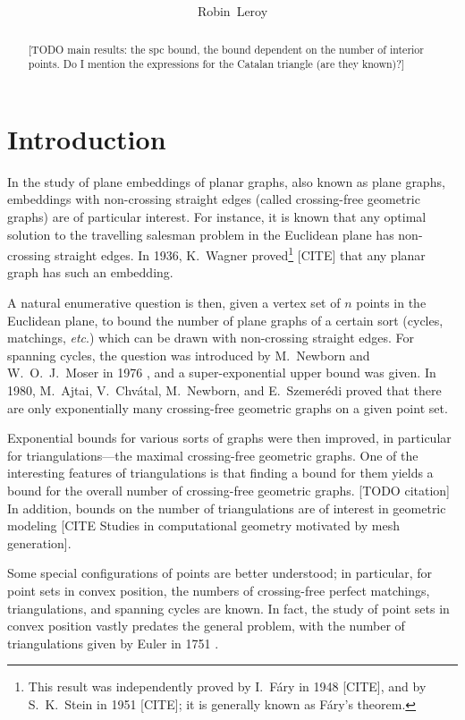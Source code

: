 \documentclass[10pt, a4paper, twoside]{basestyle}
\title{%
\textdisplay{%
On the number of crossing-free perfect matchings with designated left and right endpoints%
}%
}
\author{Robin~Leroy}
\newcommand{\etc}{\emph{etc}}
\begin{document}
\maketitle
\begin{abstract}
[TODO main results: the spc bound, the bound dependent on the number of interior points.
Do I mention the expressions for the Catalan triangle (are they known)?]
\end{abstract}

\section*{Introduction}
In the study of plane embeddings of planar graphs, also known as plane graphs,
embeddings with non-crossing straight edges (called crossing-free geometric graphs) are of particular
interest.
For instance, it is known \cite{LeeuwenSchoone1981} that any optimal solution to the travelling salesman problem in the
Euclidean plane has non-crossing straight edges.
In 1936, K.~Wagner proved\footnote{This result was independently proved by I.~Fáry in 1948 [CITE], and by
S.~K.~Stein in 1951 [CITE]; it is generally known as Fáry's theorem.} [CITE] that any planar graph has such an
embedding.

A natural enumerative question is then, given a vertex set of $n$ points in the Euclidean plane,
to bound the number of plane graphs of a certain sort (cycles, matchings, \etc.) which can be
drawn with non-crossing straight edges.
For spanning cycles, the question was introduced by M.~Newborn and W.~O.~J.~Moser in 1976 \cite{NewbornMoser1980},
and a super-exponential upper bound was given.
In 1980, M.~Ajtai, V.~Chvátal, M.~Newborn, and E.~Szemerédi \cite{AjtaiChvatalNewbornSzemeredi1982}
proved that there are only exponentially many crossing-free geometric graphs on a given point set.

Exponential bounds for various sorts of graphs were then improved, in particular for triangulations---the
maximal crossing-free geometric graphs. One of the interesting features of triangulations is that finding a bound for
them yields a bound for the overall number of crossing-free geometric graphs. [TODO citation] In addition,
bounds on the number of triangulations
are of interest in geometric modeling [CITE Studies in computational geometry motivated by mesh generation].

Some special configurations of points are better understood; in particular, for point sets in convex position,
the numbers of crossing-free perfect matchings, triangulations, and spanning cycles are known. In fact, the study
of point sets in convex position vastly predates the general problem, with the number of triangulations given by
Euler in 1751 \cite{Euler1751}.
\end{document}
